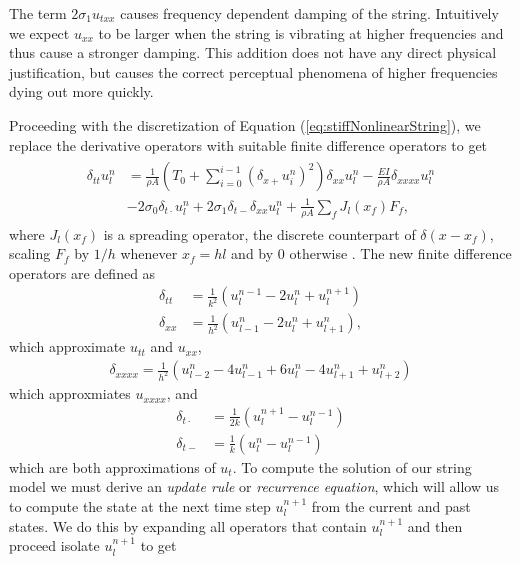 \documentclass{article}
\begin{document}
The term $2 \sigma_1 u_{txx}$ causes frequency dependent damping of the string.
Intuitively we expect $u_{xx}$ to be larger when the string is vibrating at higher frequencies and thus cause a stronger damping.
This addition does not have any direct physical justification, but causes the correct perceptual phenomena of higher frequencies dying out more quickly\cite{bensa_simulation_2003}.

Proceeding with the discretization of Equation (\ref{eq:stiffNonlinearString}), we replace the derivative operators with suitable finite difference operators to get
\begin{align}
  \begin{split}
    \delta_{tt} u^n_l &= \frac{1}{\rho A} \left(T_0 + \sum^{i-1}_{i=0} (\delta_{x+} u^n_i)^2 \right)\delta_{xx}u^n_l - \frac{E I}{\rho A} \delta_{xxxx} u^n_l\\
    &- 2 \sigma_0 \delta_{t\cdot} u^n_l + 2 \sigma_1 \delta_{t-} \delta_{xx}u^n_l + \frac{1}{\rho A} \sum_fJ_l(x_f)F_f,
  \end{split}
\end{align}
where $J_l(x_f)$ is a spreading operator, the discrete counterpart of $\delta(x-x_f)$, scaling $F_f$ by $1/h$ whenever $x_f = hl$ and by $0$ otherwise \cite[Chapter 5]{bilbao_numerical_2009}.
The new finite difference operators are defined as
\begin{align}
  \delta_{tt} &= \frac{1}{k^2}(u^{n-1}_l - 2 u^n_l + u^{n+1}_l) \\
  \delta_{xx} &= \frac{1}{h^2}(u^n_{l-1} - 2 u^n_l + u^n_{l+1}),
\end{align}
which approximate $u_{tt}$ and $u_{xx}$,
\begin{align}
  \delta_{xxxx} = \frac{1}{h^2}(u^n_{l-2} - 4 u^n_{l-1} + 6 u^n_l - 4 u^n_{l+1} + u^n_{l+2})
\end{align}
which approxmiates $u_{xxxx}$, and
\begin{align}
  \delta_{t\cdot} &= \frac{1}{2k} (u^{n+1}_l - u^{n-1}_l) \\
  \delta_{t-} &=\frac{1}{k} (u^{n}_l - u^{n-1}_l)
\end{align}
which are both approximations of $u_t$. To compute the solution of our string model we must derive an \textit{update rule} or \textit{recurrence equation}, which will allow us to compute the state at the next time step $u^{n+1}_l$ from the current and past states.
We do this by expanding all operators that contain $u^{n+1}_l$ and then proceed isolate $u^{n+1}_l$ to get
\end{document}

